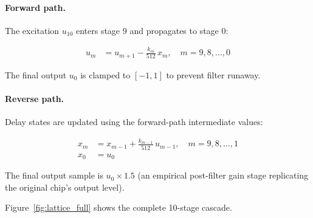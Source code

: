 \documentclass[10pt]{article}
\begin{document}
\paragraph{Forward path.}  The excitation $u_{10}$ enters stage 9 and
propagates to stage 0:

\begin{align}
u_m &= u_{m+1} - \frac{k_m}{512}\, x_m, \quad m = 9, 8, \ldots, 0
\label{eq:forward}
\end{align}

The final output $u_0$ is clamped to $[-1, 1]$ to prevent filter runaway.

\paragraph{Reverse path.}  Delay states are updated using the forward-path
intermediate values:

\begin{align}
x_m &= x_{m-1} + \frac{k_{m-1}}{512}\, u_{m-1}, \quad m = 9, 8, \ldots, 1 \nonumber\\
x_0 &= u_0
\label{eq:reverse}
\end{align}

The final output sample is $u_0 \times 1.5$ (an empirical post-filter gain
stage replicating the original chip's output level).

Figure~\ref{fig:lattice_full} shows the complete 10-stage cascade.
\end{document}
